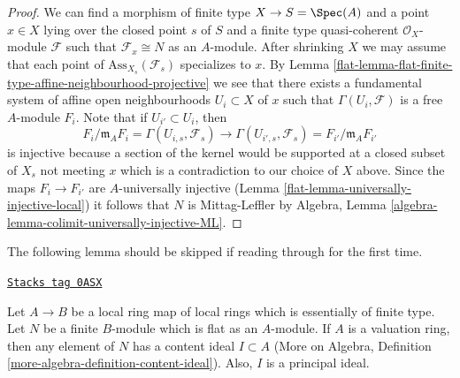 \begin{proof}

We can find a morphism of finite type $X \to S = \Spec(A)$
and a point $x \in X$ lying over the closed point $s$ of $S$ and a finite
type quasi-coherent $\mathcal{O}_X$-module $\mathcal{F}$ such that
$\mathcal{F}_x \cong N$ as an $A$-module. After shrinking $X$
we may assume that each point of $\text{Ass}_{X_s}(\mathcal{F}_s)$ specializes
to $x$. By
Lemma \ref{flat-lemma-flat-finite-type-affine-neighbourhood-projective}
we see that there exists a fundamental system of affine open neighbourhoods
$U_i \subset X$ of $x$ such that $\Gamma(U_i, \mathcal{F})$ is
a free $A$-module $F_i$. Note that if $U_{i'} \subset U_i$, then
$$
F_i/\mathfrak m_AF_i = \Gamma(U_{i, s}, \mathcal{F}_s)
\longrightarrow
\Gamma(U_{i', s}, \mathcal{F}_s) = F_{i'}/\mathfrak m_AF_{i'}
$$
is injective because a section of the kernel would be supported at
a closed subset of $X_s$ not meeting $x$ which is a contradiction
to our choice of $X$ above. Since the maps $F_i \to F_{i'}$ are
$A$-universally injective (Lemma \ref{flat-lemma-universally-injective-local})
it follows that $N$ is
Mittag-Leffler by
Algebra, Lemma \ref{algebra-lemma-colimit-universally-injective-ML}.
\end{proof}

The following lemma should be skipped if reading through for the first time.

\begin{lemma}
\label{flat-lemma-flat-finite-type-local-valuation-ring-has-content}
\href{https://stacks.math.columbia.edu/tag/0ASX}{\texttt{Stacks tag 0ASX}}

Let $A \to B$ be a local ring map of local rings which is essentially of
finite type. Let $N$ be a finite $B$-module which is flat as an $A$-module.
If $A$ is a valuation ring, then any element of $N$ has a content ideal
$I \subset A$ (More on Algebra, Definition
\ref{more-algebra-definition-content-ideal}). Also, $I$ is a
principal ideal.
\end{lemma}

